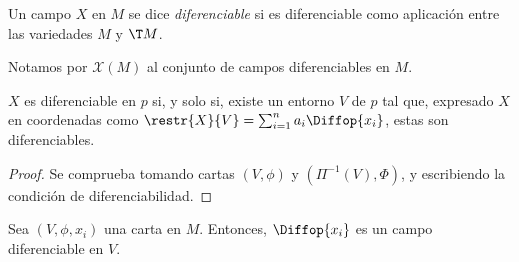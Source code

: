 \begin{ndef}
  Un campo $X$ en $M$ se dice \emph{diferenciable} si es diferenciable como
  aplicación entre las variedades $M$ y $\T M$.
\end{ndef}

Notamos por $\mathscr{X}(M)$ al conjunto de campos diferenciables en $M$.

\begin{nprop}
  $X$ es diferenciable en $p$ si, y solo si, existe un entorno $V$ de $p$ tal
  que, expresado $X$ en coordenadas como $\restr{X}{V} =
  \sum_{i=1}^{n}a_{i}\Diffop{x_{i}}$, estas son diferenciables.
\end{nprop}
\begin{proof}
  Se comprueba tomando cartas $(V,\phi)$ y $(\Pi^{-1}(V), \Phi)$, y escribiendo
  la condición de diferenciabilidad.
\end{proof}

\begin{ejemplo}
  Sea $(V,\phi,x_{i})$ una carta en $M$. Entonces, $\Diffop{x_{i}}$ es un campo
  diferenciable en $V$.
\end{ejemplo}